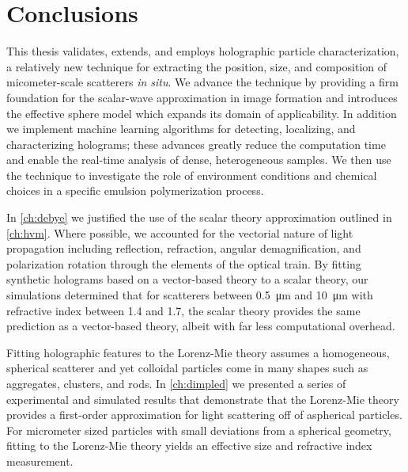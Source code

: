 \chapter{Conclusions}
\label{ch:conclusion}

This thesis validates, extends, and employs holographic
particle characterization, a relatively new technique
for extracting the position, size, and composition
of micometer-scale scatterers \emph{in situ}. We
advance the technique by providing a
firm foundation for the scalar-wave approximation
in image formation and introduces the effective
sphere model which expands its domain of applicability.
In addition we implement machine learning algorithms for
detecting, localizing, and characterizing holograms; these
advances greatly reduce the computation time and enable
the real-time analysis of dense, heterogeneous samples.
We then use the technique to investigate the role of
environment conditions and chemical choices in
a specific emulsion polymerization process.

In \autoref{ch:debye} we justified the use of the scalar theory
approximation outlined in \autoref{ch:hvm}.
Where possible, we accounted for the vectorial nature
of light propagation including reflection, refraction,
angular demagnification, and polarization rotation
through the elements of the optical train. By fitting synthetic holograms
based on a vector-based theory to a scalar theory,
our simulations determined that for scatterers between \SI{0.5}{\um}
and \SI{10}{\um} with refractive index between \SI{1.4}{} and \SI{1.7}{},
the scalar theory provides the same prediction as a vector-based theory,
albeit with far less computational overhead. 

Fitting holographic features to the Lorenz-Mie theory
assumes a homogeneous, spherical scatterer and yet colloidal particles
come in many shapes such as aggregates, clusters, and rods. In \autoref{ch:dimpled}
we presented a series of experimental and simulated results that demonstrate
that the Lorenz-Mie theory provides a first-order approximation for light scattering
off of aspherical particles. For micrometer sized particles with small deviations
from a spherical geometry, fitting to the Lorenz-Mie theory yields
an effective size and refractive index measurement.

